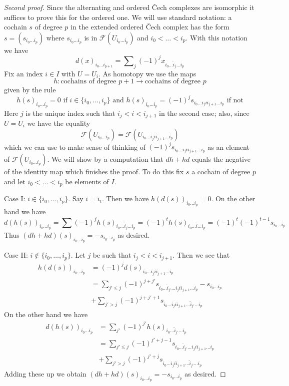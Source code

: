 \begin{proof}[Second proof]
Since the alternating and ordered {\v C}ech complexes are isomorphic
it suffices to prove this for the ordered one.
We will use standard notation: a cochain $s$ of degree $p$
in the extended ordered {\v C}ech complex has the form
$s = (s_{i_0 \ldots i_p})$ where $s_{i_0 \ldots i_p}$ is in
$\mathcal{F}(U_{i_0 \ldots i_p})$ and $i_0 < \ldots < i_p$.
With this notation we have
$$
d(x)_{i_0 \ldots i_{p + 1}} =
\sum\nolimits_j (-1)^j x_{i_0 \ldots \hat i_j \ldots i_p}
$$
Fix an index $i \in I$ with $U = U_i$.
As homotopy we use the maps
$$
h : \text{cochains of degree }p + 1 \to \text{cochains of degree }p
$$
given by the rule
$$
h(s)_{i_0 \ldots i_p} = 0 \text{ if } i \in \{i_0, \ldots, i_p\}
\text{ and }
h(s)_{i_0 \ldots i_p} =
(-1)^j s_{i_0 \ldots i_j i i_{j + 1} \ldots i_p} \text{ if not}
$$
Here $j$ is the unique index such that $i_j < i < i_{j + 1}$ in the
second case; also, since $U = U_i$ we have the equality
$$
\mathcal{F}(U_{i_0 \ldots i_p}) =
\mathcal{F}(U_{i_0 \ldots i_j i i_{j + 1} \ldots i_p})
$$
which we can use to make sense of thinking of
$(-1)^j s_{i_0 \ldots i_j i i_{j + 1} \ldots i_p}$
as an element of $\mathcal{F}(U_{i_0 \ldots i_p})$.
We will show by a computation that $d h + h d$ equals
the negative of the identity map which finishes the proof.
To do this fix $s$ a cochain of degree $p$ and let
$i_0 < \ldots < i_p$ be elements of $I$.

\medskip\noindent
Case I: $i \in \{i_0, \ldots, i_p\}$. Say $i = i_t$. Then we have
$h(d(s))_{i_0 \ldots i_p} = 0$. On the other hand we have
$$
d(h(s))_{i_0 \ldots i_p} =
\sum (-1)^j h(s)_{i_0 \ldots \hat i_j \ldots i_p} =
(-1)^t h(s)_{i_0 \ldots \hat i \ldots i_p} =
(-1)^t (-1)^{t - 1} s_{i_0 \ldots i_p}
$$
Thus $(dh + hd)(s)_{i_0 \ldots i_p} = -s_{i_0 \ldots i_p}$ as desired.

\medskip\noindent
Case II: $i \not \in \{i_0, \ldots, i_p\}$. Let $j$ be such that
$i_j < i < i_{j + 1}$. Then we see that
\begin{align*}
h(d(s))_{i_0 \ldots i_p}
& =
(-1)^j d(s)_{i_0 \ldots i_j i i_{j + 1} \ldots i_p} \\
& =
\sum\nolimits_{j' \leq j} (-1)^{j + j'}
s_{i_0 \ldots \hat i_{j'} \ldots i_j i i_{j + 1} \ldots i_p} -
s_{i_0 \ldots i_p} \\
&
+ \sum\nolimits_{j' > j} (-1)^{j + j' + 1}
s_{i_0 \ldots i_j i i_{j + 1} \ldots \hat i_{j'} \ldots i_p}
\end{align*}
On the other hand we have
\begin{align*}
d(h(s))_{i_0 \ldots i_p}
& =
\sum\nolimits_{j'} (-1)^{j'} h(s)_{i_0 \ldots \hat i_{j'} \ldots i_p} \\
& =
\sum\nolimits_{j' \leq j} (-1)^{j' + j - 1}
s_{i_0 \ldots \hat i_{j'} \ldots i_j i i_{j + 1} \ldots i_p} \\
& +
\sum\nolimits_{j' > j} (-1)^{j' + j}
s_{i_0 \ldots i_j i i_{j + 1} \ldots \hat i_{j'} \ldots i_p}
\end{align*}
Adding these up we obtain
$(dh + hd)(s)_{i_0 \ldots i_p} = - s_{i_0 \ldots i_p}$
as desired.
\end{proof}





